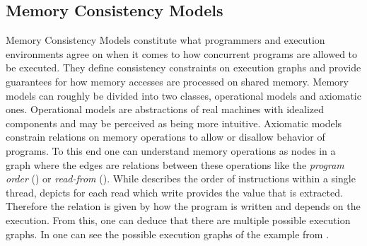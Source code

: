 \documentclass[a4paper,twoside,12pt, english]{article}
\begin{document}
\subsection{Memory Consistency Models}\label{sec:MCM}
Memory Consistency Models constitute what programmers and execution environments agree on when it comes to how concurrent programs are allowed to be executed. They define consistency constraints on execution graphs and provide guarantees for how memory accesses are processed on shared memory.
Memory models can roughly be divided into two classes, operational models and axiomatic ones.
Operational models are abstractions of real machines with idealized components and may be perceived as being more intuitive. 
Axiomatic models constrain relations on memory operations to allow or disallow behavior of programs. To this end one can understand memory operations as nodes in a graph where the edges are relations between these operations like the \textit{program order} (\po) or \textit{read-from} (\rf).
While \po{} describes the order of instructions within a single thread, \rf{} depicts for each read which write provides the value that is extracted. \\
Therefore the \po{} relation is given by how the program is written and \rf{} depends on the execution.
From this, one can deduce that there are multiple possible execution graphs. In  one can see the possible execution graphs of the example from . 
\end{document}
